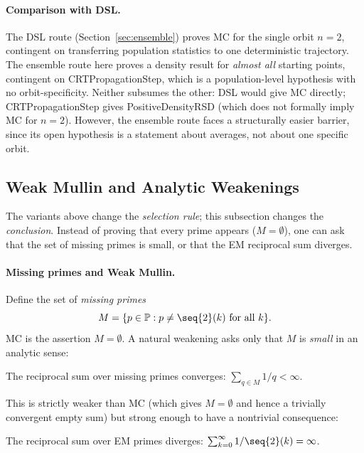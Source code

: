 \paragraph{Comparison with DSL.}
The DSL route (Section~\ref{sec:ensemble}) proves MC for the single
orbit $n = 2$, contingent on transferring population statistics to one
deterministic trajectory.
The ensemble route here proves a density result for \emph{almost all}
starting points, contingent on CRTPropagationStep, which is a
population-level hypothesis with no orbit-specificity.
Neither subsumes the other: DSL would give MC directly; CRTPropagationStep
gives PositiveDensityRSD (which does not formally imply MC for $n = 2$).
However, the ensemble route faces a structurally easier barrier, since
its open hypothesis is a statement about averages, not about one
specific orbit.

\subsection{Weak Mullin and Analytic Weakenings}
\label{sec:weak-mullin}

The variants above change the \emph{selection rule}; this subsection
changes the \emph{conclusion}.  Instead of proving that every prime
appears ($M = \emptyset$), one can ask that the set of missing
primes is small, or that the EM reciprocal sum diverges.

\paragraph{Missing primes and Weak Mullin.}
Define the set of \emph{missing primes}
\[
M = \{p \in \mathbb{P} : p \neq \seq{2}(k) \text{ for all } k\}.
\]
MC is the assertion $M = \emptyset$.  A natural weakening asks only that
$M$ is \emph{small} in an analytic sense:

\begin{property}
The reciprocal sum over missing primes converges:
$\sum_{q \in M} 1/q < \infty$.
\end{property}

This is strictly weaker than MC (which gives $M = \emptyset$ and hence
a trivially convergent empty sum) but strong enough to have a nontrivial
consequence:

\begin{property}
The reciprocal sum over EM primes diverges:
$\sum_{k=0}^{\infty} 1/\seq{2}(k) = \infty$.
\end{property}

